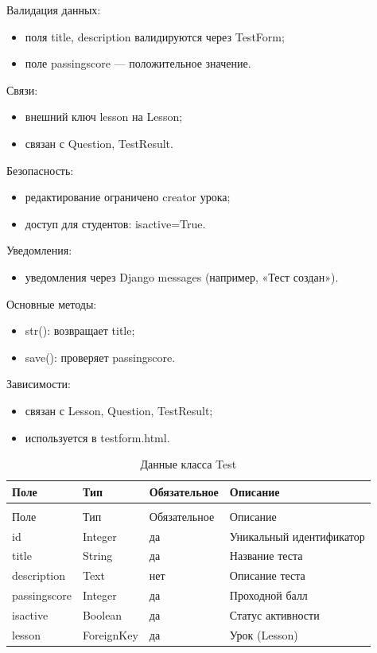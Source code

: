 Валидация данных:
	\begin{itemize}
		\item поля title, description валидируются через TestForm;
		\item поле passingscore — положительное значение.
	\end{itemize}
	
Связи:
	\begin{itemize}
		\item внешний ключ lesson на Lesson;
		\item связан с Question, TestResult.
	\end{itemize}
	
Безопасность:
	\begin{itemize}
		\item редактирование ограничено creator урока;
		\item доступ для студентов: isactive=True.
	\end{itemize}
	
Уведомления:
	\begin{itemize}
		\item уведомления через Django messages (например, «Тест создан»).
	\end{itemize}
	
Основные методы:
	\begin{itemize}
		\item str(): возвращает title;
		\item save(): проверяет passingscore.
	\end{itemize}
	
Зависимости:
	\begin{itemize}
		\item связан с Lesson, Question, TestResult;
		\item используется в testform.html.
	\end{itemize}


\begin{xltabular}{\textwidth}{|l|l|l|X|}
	\caption{Данные класса Test\label{tab:test_attributes}}\\
	\hline
	Поле & Тип & Обязательное & Описание \\ \hline
	\endfirsthead
	\\
	\hline
	Поле & Тип & Обязательное & Описание \\ \hline
	\endhead
	id & Integer & да & Уникальный идентификатор \\ \hline
	title & String & да & Название теста \\ \hline
	description & Text & нет & Описание теста \\ \hline
	passingscore & Integer & да & Проходной балл \\ \hline
	isactive & Boolean & да & Статус активности \\ \hline
	lesson & ForeignKey & да & Урок (Lesson) \\ \hline
\end{xltabular}

